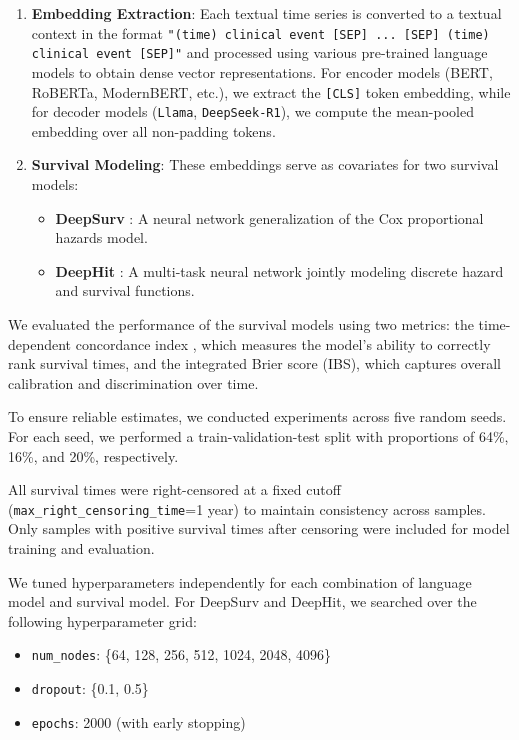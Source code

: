 \documentclass[pdflatex,sn-mathphys-num]{sn-jnl}%
\theoremstyle{thmstyleone}%
\theoremstyle{thmstyletwo}%
\theoremstyle{thmstylethree}%
\begin{document}
\begin{enumerate}
\item \textbf{Embedding Extraction}: Each textual time series is converted to a textual context in the format \texttt{"(time) clinical event [SEP] ... [SEP] (time) clinical event [SEP]"} and processed using various pre-trained language models to obtain dense vector representations. 
For encoder models (BERT, RoBERTa, ModernBERT, etc.), we extract the \texttt{[CLS]} token embedding, while for decoder models (\texttt{Llama}, \texttt{DeepSeek-R1}), we compute the mean-pooled embedding over all non-padding tokens.

\item \textbf{Survival Modeling}: These embeddings serve as covariates for two survival models:
\begin{itemize}
    \item \textbf{DeepSurv} \citep{katzman2018deepsurv}: A neural network generalization of the Cox proportional hazards model.
    \item \textbf{DeepHit} \citep{lee2018deephit}: A multi-task neural network jointly modeling discrete hazard and survival functions.
\end{itemize}
\end{enumerate}

We evaluated the performance of the survival models using two metrics: the time-dependent concordance index \citep{antolini2005time}, which measures the model’s ability to correctly rank survival times, and the integrated Brier score (IBS), which captures overall calibration and discrimination over time. 

To ensure reliable estimates, we conducted experiments across five random seeds.
For each seed, we performed a train-validation-test split with proportions of 64\%, 16\%, and 20\%, respectively. 

All survival times were right-censored at a fixed cutoff (\texttt{max\_right\_censoring\_time}=1 year) to maintain consistency across samples. 
Only samples with positive survival times after censoring were included for model training and evaluation.

We tuned hyperparameters independently for each combination of language model and survival model. 
For DeepSurv and DeepHit, we searched over the following hyperparameter grid:
\begin{itemize}
    \item \texttt{num\_nodes}: \{64, 128, 256, 512, 1024, 2048, 4096\}
    \item \texttt{dropout}: \{0.1, 0.5\}
    \item \texttt{epochs}: 2000 (with early stopping)
\end{itemize}
\end{document}
